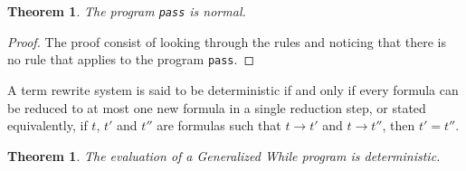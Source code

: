 \documentclass[11pt]{article}
\begin{document}
\newtheorem{passisnormal}{Theorem}
\begin{passisnormal}
The program \texttt{pass} is normal.
\end{passisnormal}

\begin{proof}
The proof consist of looking through the rules and noticing that there is no rule that applies to the program \texttt{pass}.
\end{proof}

A term rewrite system is said to be deterministic if and only if every formula can be reduced to at most one new formula in a single reduction step, or stated equivalently, if $t$, $t'$ and $t''$ are formulas such that $t \rightarrow t'$ and $t \rightarrow t''$, then $t' = t''$.

\newtheorem{determinism}{Theorem}
\begin{determinism}
The evaluation of a Generalized While program is deterministic.
\end{determinism}
\end{document}
